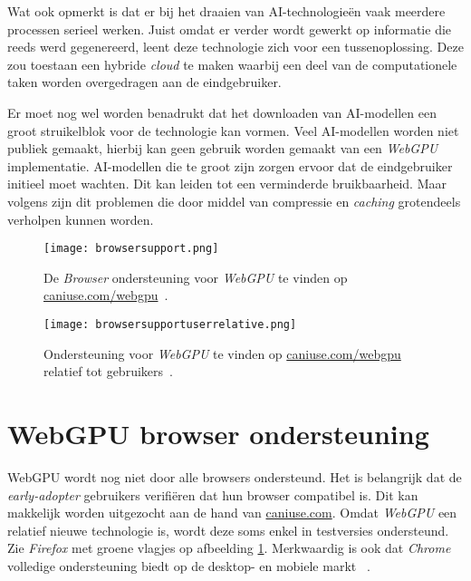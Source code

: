 \bigbreak{}

Wat \textcite{Fleetwood2022} ook opmerkt is dat er bij het draaien van  AI-technologieën vaak meerdere processen serieel werken. Juist omdat er verder wordt gewerkt op informatie die reeds werd gegenereerd, leent deze technologie zich voor een tussenoplossing. Deze zou toestaan een hybride \textit{cloud} te maken waarbij een deel van de computationele taken worden overgedragen aan de eindgebruiker.

\bigbreak{}

Er moet nog wel worden benadrukt dat het downloaden van AI-modellen een groot struikelblok voor de technologie kan vormen. Veel AI-modellen worden niet publiek gemaakt, hierbij kan geen gebruik worden gemaakt van een \textit{WebGPU} implementatie. AI-modellen die te groot zijn zorgen ervoor dat de eindgebruiker initieel moet wachten. Dit kan leiden tot een verminderde bruikbaarheid. Maar volgens \textcite{Fleetwood2022} zijn dit problemen die door middel van compressie en \textit{caching} grotendeels verholpen kunnen worden.

\break{}

\begin{figure}
    \texttt{[image: browsersupport.png]}
    \caption[Ondersteuning voor \textit{WebGPU}~\autocite{Deveria2024}]{
        De \textit{Browser} ondersteuning voor \textit{WebGPU} te vinden op \href{https://caniuse.com/webgpu}{caniuse.com/webgpu}~\autocite{Deveria2024}.
    }
    \label{fig:Browser Support}
\end{figure}

\begin{figure}
    \texttt{[image: browsersupportuserrelative.png]}
    \caption[Eindgebruikers met toegang tot \textit{WebGPU}~\autocite{Deveria2024}]{
        Ondersteuning voor \textit{WebGPU} te vinden op \href{https://caniuse.com/webgpu}{caniuse.com/webgpu} relatief tot gebruikers~\autocite{Deveria2024}.
    }
    \label{fig:Relative Browser Support}
\end{figure}

\section{WebGPU browser ondersteuning}

WebGPU wordt nog niet door alle browsers ondersteund. Het is belangrijk dat de \textit{early-adopter} gebruikers verifiëren dat hun browser compatibel is. Dit kan makkelijk worden uitgezocht aan de hand van \href{https://caniuse.com/webgpu}{caniuse.com}. Omdat \textit{WebGPU} een relatief nieuwe technologie is, wordt deze soms enkel in testversies ondersteund. Zie \textit{Firefox} met groene vlagjes op afbeelding \ref{fig:Browser Support}. Merkwaardig is ook dat \textit{Chrome} volledige ondersteuning biedt op de desktop- en mobiele markt ~\autocite{Deveria2024}.

